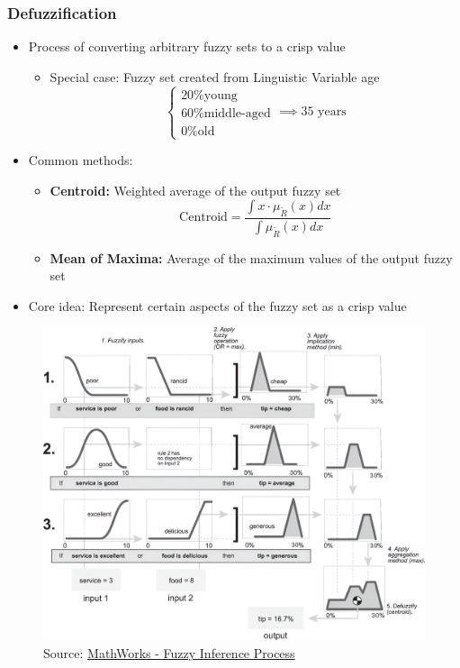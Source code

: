 \documentclass[
	10pt,
	t		%
]{beamer}
\begin{document}
\begin{frame}
	\frametitle{Defuzzification}
	\begin{itemize}
		\item Process of converting arbitrary fuzzy sets to a crisp value
		      \begin{itemize}
			      \item Special case: Fuzzy set created from Linguistic Variable age
			            \[  \begin{cases}
					            \text{20\% young}       \\
					            \text{60\% middle-aged} \\
					            \text{0\% old}
				            \end{cases} \implies \text{35 years}
			            \]
		      \end{itemize}
		\item Common methods:
		      \begin{itemize}
			      \item \textbf{Centroid:} Weighted average of the output fuzzy set
			            \[ \text{Centroid} = \frac{\int x \cdot \mu_{\tilde{R}}(x) dx}{\int \mu_{\tilde{R}}(x) dx} \]
			      \item \textbf{Mean of Maxima:} Average of the maximum values of the output fuzzy set
		      \end{itemize}
		\item Core idea: Represent certain aspects of the fuzzy set as a crisp value
	\end{itemize}

\end{frame}



\begin{frame}
	\vspace{-0.8cm}
	\begin{figure}
		\centering
		\caption{\tiny{Source: \href{https://de.mathworks.com/help/fuzzy/fuzzy-inference-process.html}{MathWorks - Fuzzy Inference Process}}}
		\includegraphics[width=0.8\paperwidth]{figures/FullInferenceProcess.png}
	\end{figure}
	\label{fig:fuzzy_inference_full}

\end{frame}
\end{document}
